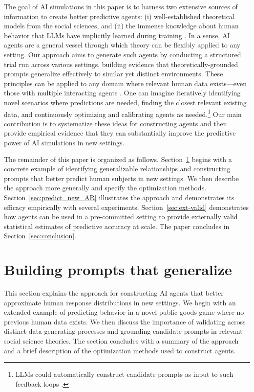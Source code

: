 \documentclass[11pt]{article}
\theoremstyle{definition}
\newcommand{\aisub}{AI agent}
\newcommand{\persona}{prompt}
\begin{document}
The goal of AI simulations in this paper is to harness two extensive sources of information to create better predictive agents: (i) well-established theoretical models from the social sciences, and (ii) the immense knowledge about human behavior that LLMs have implicitly learned during training \citep{lindsey2025biology,ameisen2025circuit}.
In a sense, \aisub{s} are a general vessel through which theory can be flexibly applied to any setting.
Our approach aims to generate such agents by conducting a structured trial run across various settings, building evidence that theoretically-grounded \persona{s} generalize effectively to similar yet distinct environments.
These principles can be applied to any domain where relevant human data exists---even those with multiple interacting agents \citep{Manning2024Automated,qian2025strategicbargaining}.
One can imagine iteratively identifying novel scenarios where predictions are needed, finding the closest relevant existing data, and continuously optimizing and calibrating agents as needed.\footnote{LLMs could automatically construct candidate \persona{s} as input to such feedback loops \citep{Jackson2025Mixture}.}
Our main contribution is to systematize these ideas for constructing agents and then provide empirical evidence that they can substantially improve the predictive power of AI simulations in new settings.

The remainder of this paper is organized as follows.
Section~\ref{sec:approach} begins with a concrete example of identifying generalizable relationships and constructing \persona{s} that better predict human subjects in new settings.
We then describe the approach more generally and specify the optimization methods.
Section~\ref{sec:predict_new_AR} illustrates the approach and demonstrates its efficacy empirically with several experiments.
Section~\ref{sec:ext-valid} demonstrates how agents can be used in a pre-committed setting to provide externally valid statistical estimates of predictive accuracy at scale.
The paper concludes in Section~\ref{sec:conclusion}.

\section{Building \persona{s} that generalize}
\label{sec:approach}

This section explains the approach for constructing \aisub{s} that better approximate human response distributions in new settings.
We begin with an extended example of predicting behavior in a novel public goods game where no previous human data exists.
We then discuss the importance of validating across distinct data-generating processes and grounding candidate \persona{s} in relevant social science theories.
The section concludes with a summary of the approach and a brief description of the optimization methods used to construct agents.
\end{document}
